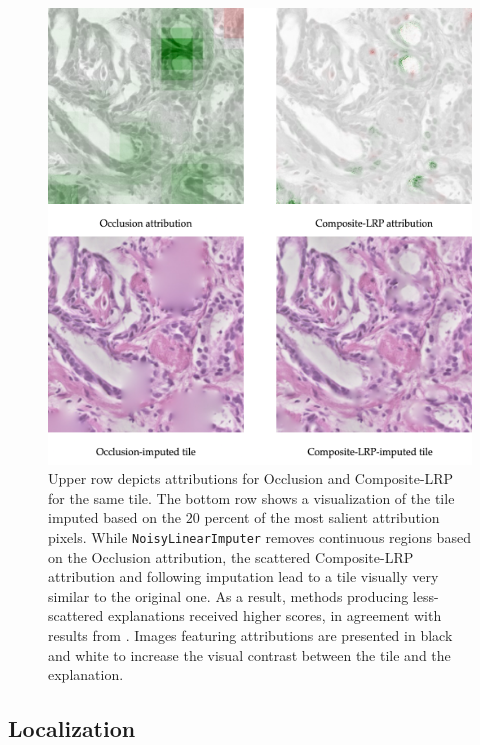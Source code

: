 \begin{figure}
    \begin{center}
    \begin{minipage}{0.8\textwidth}
      \includegraphics[width=\textwidth]{img/road-impute.png}
    \end{minipage}
    \caption{Upper row depicts attributions for Occlusion and Composite-LRP for the same tile. The bottom row shows a visualization of the tile imputed based on the $20$ percent of the most salient attribution pixels. While \texttt{NoisyLinearImputer} removes continuous regions based on the Occlusion attribution, the scattered Composite-LRP attribution and following imputation lead to a tile visually very similar to the original one. As a result, methods producing less-scattered explanations received higher scores, in agreement with results from \cite{gallo}. Images featuring attributions are presented in black and white to increase the visual contrast between the tile and the explanation.}
    \label{fig:road-impute}
    \end{center}
\end{figure}

\subsection*{Localization}

